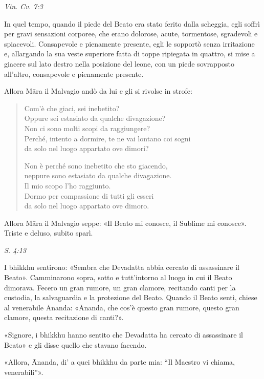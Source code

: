 \emph{Vin. Cv. 7:3}


 In quel tempo, quando il piede del Beato era stato ferito
dalla scheggia, egli soffrì per gravi sensazioni corporee, che erano
dolorose, acute, tormentose, sgradevoli e spiacevoli. Consapevole e
pienamente presente, egli le sopportò senza irritazione e, allargando la
sua veste superiore fatta di toppe ripiegata in quattro, si mise a
giacere sul lato destro nella posizione del leone, con un piede
sovrapposto all’altro, consapevole e pienamente presente.


Allora Māra il Malvagio andò da lui e gli si rivolse in strofe:


\begin{quote}
Com’è che giaci, sei inebetito? \\
Oppure sei estasiato da qualche divagazione? \\
Non ci sono molti scopi da raggiungere? \\
Perché, intento a dormire, te ne vai lontano coi sogni \\
da solo nel luogo appartato ove dimori?


Non è perché sono inebetito che sto giacendo, \\
neppure sono estasiato da qualche divagazione. \\
Il mio scopo l’ho raggiunto. \\
Dormo per compassione di tutti gli esseri \\
da solo nel luogo appartato ove dimoro.
\end{quote}

Allora Māra il Malvagio seppe: «Il Beato mi conosce, il Sublime mi
conosce». Triste e deluso, subito sparì.


\emph{S. 4:13}


 I bhikkhu sentirono: «Sembra che Devadatta abbia cercato
di assassinare il Beato». Camminarono sopra, sotto e tutt’intorno al
luogo in cui il Beato dimorava. Fecero un gran rumore, un gran clamore,
recitando canti per la custodia, la salvaguardia e la protezione del
Beato. Quando il Beato sentì, chiese al venerabile Ānanda: «Ānanda, che
cos’è questo gran rumore, questo gran clamore, questa recitazione di
canti?».


«Signore, i bhikkhu hanno sentito che Devadatta ha cercato di
assassinare il Beato» e gli disse quello che stavano facendo.


«Allora, Ānanda, di' a quei bhikkhu da parte mia: “Il Maestro vi chiama,
venerabili”».


